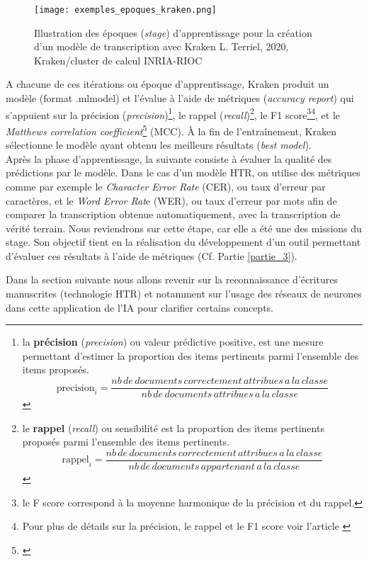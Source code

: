 \begin{figure}[h]
    \centering
    \centerline{\texttt{[image: exemples\_epoques\_kraken.png]}}
    \caption{Illustration des époques (\textit{stage}) d'apprentissage pour la création d'un modèle de transcription avec Kraken \textcopyright L. Terriel, 2020, Kraken/cluster de calcul INRIA-RIOC}
    \label{fig:epoque_kraken_prompt}
\end{figure}
\newpage
A chacune de ces itérations ou époque d'apprentissage, Kraken produit un modèle (format .mlmodel) et l'évalue à l'aide de métriques (\textit{accuracy report}) qui s'appuient sur la précision (\textit{precision})\footnote{la \textbf{précision} (\textit{precision}) ou valeur prédictive positive, est une mesure permettant d'estimer la proportion des items pertinents parmi l'ensemble des items proposés.
$$ \text{precision}_i = \frac{nb\,de\,documents\,correctement\,attribues\,a\,la\,classe}{nb\,de\,documents\,attribues\,a\,la\,classe} $$}, le rappel (\textit{recall})\footnote{le \textbf{rappel} (\textit{recall}) ou sensibilité est la proportion des items pertinents proposés parmi l'ensemble des items pertinents. 
$$ \text{rappel}_i = \frac{nb\,de\,documents\,correctement\,attribues\,a\,la\,classe}{nb\,de\,documents\,appartenant\,a\,la\,classe} $$}, le F1 score\footnote{le F score correspond à la moyenne harmonique de la précision et du rappel.}\footnote{Pour plus de détails sur la précision, le rappel et le F1 score voir l'article \cite{noauthor_precision_2020}}, et le \textit{Matthews correlation coefficient}\footnote{\cite{noauthor_matthews_2020}} (MCC). À la fin de l'entraînement, Kraken sélectionne le modèle ayant obtenu les meilleurs résultats (\textit{best model}).\\

Après la phase d'apprentissage, la suivante consiste à évaluer la qualité des prédictions par le modèle. Dans le cas d'un modèle HTR, on utilise des métriques comme par exemple le \textit{Character Error Rate} (CER), ou taux d'erreur par caractères, et le \textit{Word Error Rat}e (WER), ou taux d'erreur par mots afin de comparer la transcription obtenue automatiquement, avec la transcription de vérité terrain. 
\newpage
Nous reviendrons sur cette étape, car elle a été une des missions du stage. Son objectif tient en la réalisation du développement d'un outil permettant d'évaluer ces résultats à l'aide de métriques (Cf. Partie \ref{partie_3}).

Dans la section suivante nous allons revenir sur la reconnaissance d'écritures manuscrites (technologie HTR) et notamment sur l'usage des réseaux de neurones dans cette application de l'IA pour clarifier certains concepts.

